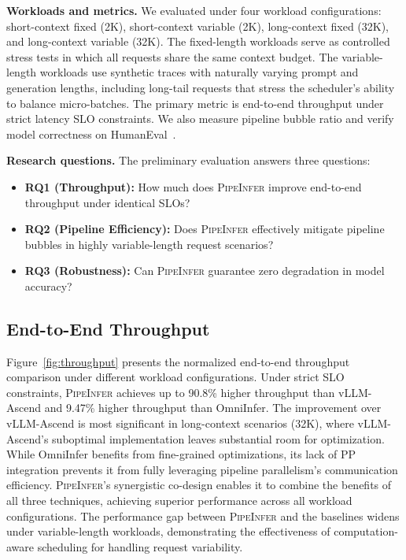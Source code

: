 \documentclass[12pt,a4paper]{article}
\newcommand{\sys}{\textsc{PipeInfer}\xspace}
\newcommand{\timesched}{computation-aware scheduling\xspace}
\newcommand{\vllmgain}{90.8\%\xspace}
\newcommand{\omnigain}{9.47\%\xspace}
\begin{document}
\textbf{Workloads and metrics.}
We evaluated under four workload configurations: short-context fixed (2K), short-context variable (2K), long-context fixed (32K), and long-context variable (32K).
The fixed-length workloads serve as controlled stress tests in which all requests share the same context budget.
The variable-length workloads use synthetic traces with naturally varying prompt and generation lengths, including long-tail requests that stress the scheduler's ability to balance micro-batches.
The primary metric is end-to-end throughput under strict latency SLO constraints.
We also measure pipeline bubble ratio and verify model correctness on HumanEval~\cite{human-eval}.

\textbf{Research questions.}
The preliminary evaluation answers three questions:
\begin{itemize}[leftmargin=*]
    \item \textbf{RQ1 (Throughput):} How much does \sys improve end-to-end throughput under identical SLOs?
    \item \textbf{RQ2 (Pipeline Efficiency):} Does \sys effectively mitigate pipeline bubbles in highly variable-length request scenarios?
    \item \textbf{RQ3 (Robustness):} Can \sys guarantee zero degradation in model accuracy?
\end{itemize}

\subsection{End-to-End Throughput}

Figure~\ref{fig:throughput} presents the normalized end-to-end throughput comparison under different workload configurations.
Under strict SLO constraints, \sys achieves up to \vllmgain higher throughput than vLLM-Ascend and \omnigain higher throughput than OmniInfer.
The improvement over vLLM-Ascend is most significant in long-context scenarios (32K), where vLLM-Ascend's suboptimal implementation leaves substantial room for optimization.
While OmniInfer benefits from fine-grained optimizations, its lack of PP integration prevents it from fully leveraging pipeline parallelism's communication efficiency.
\sys's synergistic co-design enables it to combine the benefits of all three techniques, achieving superior performance across all workload configurations.
The performance gap between \sys and the baselines widens under variable-length workloads, demonstrating the effectiveness of \timesched for handling request variability.
\end{document}
